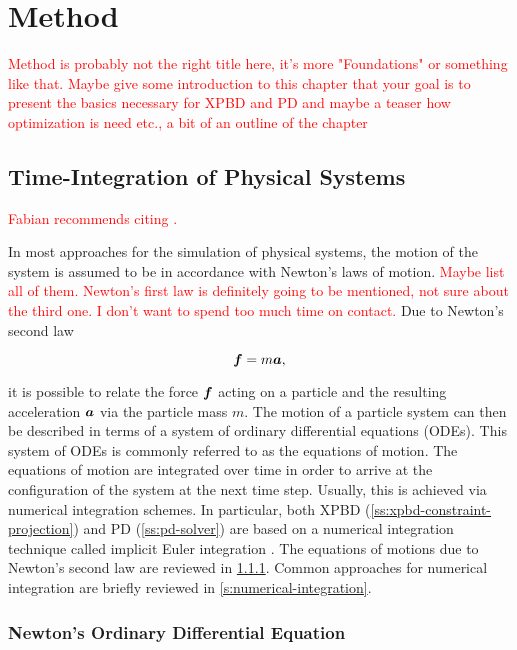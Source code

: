 \chapter{Method}\label{ch:method}

\textcolor{red}{Method is probably not the right title here, it's more "Foundations" or something like that.
Maybe give some introduction to this chapter that your goal is to present the basics necessary for XPBD and 
PD and maybe a teaser how optimization is need etc., a bit of an outline of the chapter
}

\section{Time-Integration of Physical Systems}\label{s:physical-integration}
\textcolor{red}{Fabian recommends citing \cite{gast2015}.}

In most approaches for the simulation of physical systems, the motion of the system is assumed to be in accordance with Newton's laws of
motion. \textcolor{red}{Maybe list all of them. Newton's first law is definitely going to be mentioned, not sure about the third one. I
don't want to spend too much time on contact.} Due to Newton's second law 

\begin{equation}\label{newtons-laws-2}
    \bm{f} = m\bm{a},
\end{equation}

\noindent it is possible to relate the force $\bm{f}$ acting on a particle and the resulting acceleration $\bm{a}$ via the particle
mass $m$. The motion of a particle system can then be described in terms of a system of ordinary differential equations (ODEs). This
system of ODEs is commonly referred to as the equations of motion. The equations of motion are integrated over time in order to arrive 
at the configuration of the system at the next time step. Usually, this is achieved via numerical integration schemes. In particular, both
XPBD (\cref{ss:xpbd-constraint-projection}) and PD (\cref{ss:pd-solver}) are based on a numerical integration technique called implicit 
Euler integration \cite{macklin2016, bouaziz2014}. The equations of motions due to Newton's second law are reviewed in 
\cref{s:equations-of-motion}. Common approaches for numerical integration are briefly reviewed in \cref{s:numerical-integration}. 

\subsection{Newton's Ordinary Differential Equation}\label{s:equations-of-motion}

